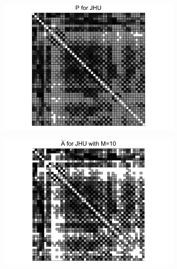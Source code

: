 \documentclass[a4paper]{article}
\begin{document}
\begin{figure}
\centering
\begin{subfigure}{.33\textwidth}
  \centering
  \includegraphics[width=1.2\linewidth]{P_JHU.png}
\end{subfigure}%
\begin{subfigure}{.33\textwidth}
  \centering
  \includegraphics[width=1.2\linewidth]{Abar_JHU_m10.png}
\end{subfigure}
\begin{subfigure}{.33\textwidth}
  \centering

\end{subfigure}
\end{figure}
\end{document}
